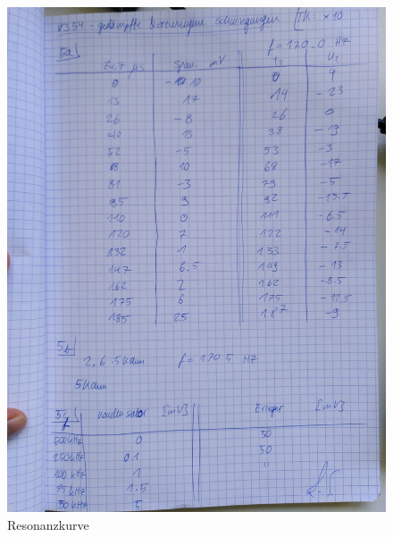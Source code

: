 \begin{figure}
  \centering
  \includegraphics{anhang2.jpeg}
  \caption{Resonanzkurve}
  \label{fig:plot2}
\end{figure}


